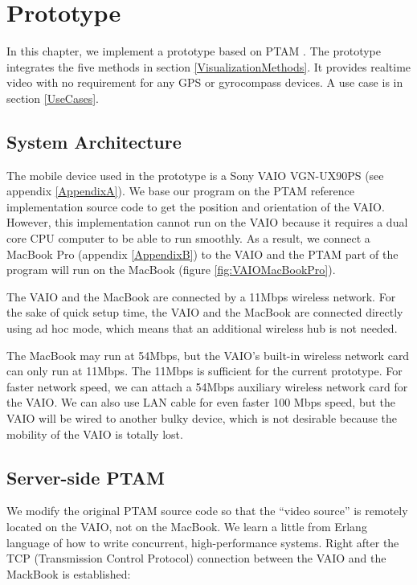 \chapter{Prototype}
\label{Chapter3}

In this chapter, we implement a prototype based on PTAM \cite{Reference12}. The prototype integrates the five methods in section \ref{VisualizationMethods}. It provides realtime video with no requirement for any GPS or gyrocompass devices. A use case is in section \ref{UseCases}.


\section{System Architecture}

The mobile device used in the prototype is a Sony VAIO VGN-UX90PS (see appendix \ref{AppendixA}). We base our program on the PTAM reference implementation source code \cite{Reference16} to get the position and orientation of the VAIO. However, this implementation cannot run on the VAIO because it requires a dual core CPU computer to be able to run smoothly. As a result, we connect a MacBook Pro (appendix \ref{AppendixB}) to the VAIO and the PTAM part of the program will run on the MacBook (figure \ref{fig:VAIOMacBookPro}).

The VAIO and the MacBook are connected by a 11Mbps wireless network. For the sake of quick setup time, the VAIO and the MacBook are connected directly using ad hoc mode, which means that an additional wireless hub is not needed.

The MacBook may run at 54Mbps, but the VAIO's built-in wireless network card can only run at 11Mbps. The 11Mbps is sufficient for the current prototype. For faster network speed, we can attach a 54Mbps auxiliary wireless network card for the VAIO. We can also use LAN cable for even faster 100 Mbps speed, but the VAIO will be wired to another bulky device, which is not desirable because the mobility of the VAIO is totally lost.


\section{Server-side PTAM}

We modify the original PTAM source code so that the ``video source'' is remotely located on the VAIO, not on the MacBook. We learn a little from Erlang language \cite{Reference17} of how to write concurrent, high-performance systems. Right after the TCP (Transmission Control Protocol) connection between the VAIO and the MackBook is established:

